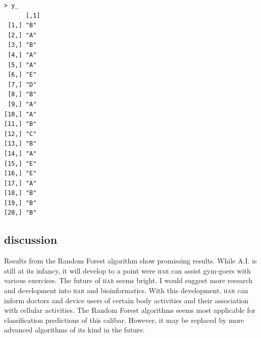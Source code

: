 \documentclass[10pt, twoside]{article}
\begin{document}
\begin{verbatim}
> y_
      [,1]
 [1,] "B"
 [2,] "A"
 [3,] "B"
 [4,] "A"
 [5,] "A"
 [6,] "E"
 [7,] "D"
 [8,] "B"
 [9,] "A"
[10,] "A"
[11,] "B"
[12,] "C"
[13,] "B"
[14,] "A"
[15,] "E"
[16,] "E"
[17,] "A"
[18,] "B"
[19,] "B"
[20,] "B"
\end{verbatim}

\begin{center}
\subsection{discussion}
\vspace{-3ex}
\end{center}

\noindent
Results from the Random Forest algorithm show promissing results. While A.I. is still at
its infancy, it will develop to a point were \textsc{har} can assist gym-goers with various
exercises. The future of \textsc{har} seems bright. I would suggest more research and development into
\textsc{har} and bioinformatics. With this development, \textsc{har} can inform doctors and device users
of certain body activities and their association with cellular activities. The Random Forest
algorithms seems most applicable for classification predictions of this calibar. However, it
may be replaced by more advanced algorithms of its kind in the future.
\end{document}

